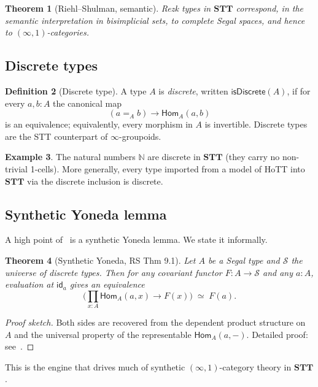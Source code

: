 \documentclass[12pt]{article}
\newtheorem{theorem}{Theorem}[section]
\theoremstyle{definition}
\newtheorem{definition}[theorem]{Definition}
\newtheorem{example}[theorem]{Example}
\theoremstyle{remark}
\newcommand{\N}{\mathbb{N}}
\newcommand{\Hom}{\mathsf{Hom}}
\newcommand{\id}{\mathsf{id}}
\newcommand{\eqv}{\simeq}
\newcommand{\isDisc}{\mathsf{isDiscrete}}
\newcommand{\STT}{\mathbf{STT}}
\begin{document}
\begin{theorem}[Riehl--Shulman, semantic]\label{thm:rs-semantic}
Rezk types in $\STT$ correspond, in the semantic interpretation in bisimplicial sets, to complete Segal spaces, and hence to $(\infty,1)$-categories.
\end{theorem}

\subsection{Discrete types}

\begin{definition}[Discrete type]\label{def:discrete}
A type $A$ is \emph{discrete}, written $\isDisc(A)$, if for every $a, b : A$ the canonical map
\[
(a =_A b) \to \Hom_A(a,b)
\]
is an equivalence; equivalently, every morphism in $A$ is invertible. Discrete types are the STT counterpart of $\infty$-groupoids.
\end{definition}

\begin{example}\label{ex:discrete-types}
The natural numbers $\N$ are discrete in $\STT$ (they carry no non-trivial 1-cells). More generally, every type imported from a model of HoTT into $\STT$ via the discrete inclusion is discrete.
\end{example}

\subsection{Synthetic Yoneda lemma}

A high point of~\cite{RiehlShulman} is a synthetic Yoneda lemma. We state it informally.

\begin{theorem}[Synthetic Yoneda, RS Thm 9.1]\label{thm:yoneda}
Let $A$ be a Segal type and $\mathcal{S}$ the universe of discrete types. Then for any covariant functor $F : A \to \mathcal{S}$ and any $a : A$, evaluation at $\id_a$ gives an equivalence
\[
\Big( \prod_{x : A} \Hom_A(a, x) \to F(x) \Big) \;\eqv\; F(a).
\]
\end{theorem}

\begin{proof}[Proof sketch]
Both sides are recovered from the dependent product structure on $A$ and the universal property of the representable $\Hom_A(a,-)$. Detailed proof: see~\cite[\S 9]{RiehlShulman}.
\end{proof}

This is the engine that drives much of synthetic $(\infty,1)$-category theory in $\STT$.
\end{document}
